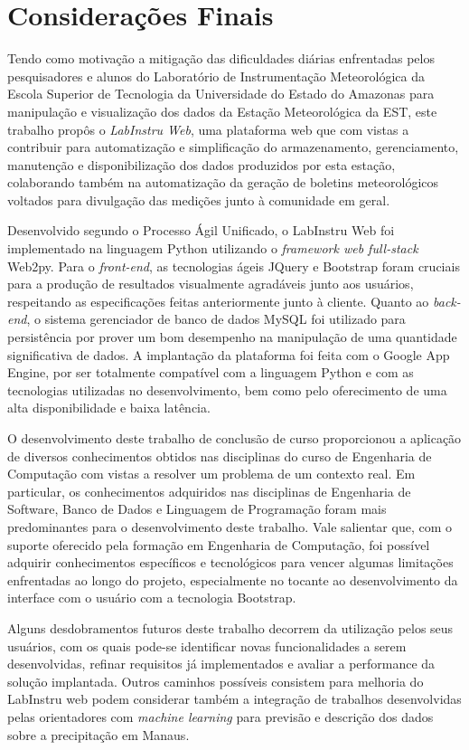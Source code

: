 \chapter{Considerações Finais} \label{cap:consideracoes}

Tendo como motivação a mitigação das dificuldades diárias enfrentadas pelos pesquisadores e alunos do Laboratório de Instrumentação Meteorológica da Escola Superior de Tecnologia da Universidade do Estado do Amazonas para manipulação e visualização dos dados da Estação Meteorológica da EST, este trabalho propôs o \emph{LabInstru Web}, uma plataforma web que com vistas a contribuir para automatização e simplificação do armazenamento, gerenciamento, manutenção e disponibilização dos dados produzidos por esta estação, colaborando também na automatização da geração de boletins meteorológicos voltados para divulgação das medições junto à comunidade em geral.

Desenvolvido segundo o Processo Ágil Unificado, o LabInstru Web foi implementado na linguagem Python utilizando o \emph{framework web full-stack} Web2py. Para o \emph{front-end}, as tecnologias ágeis JQuery e Bootstrap foram cruciais para a produção de resultados visualmente agradáveis junto aos usuários, respeitando as especificações feitas anteriormente junto à cliente. Quanto ao \emph{back-end}, o sistema gerenciador de banco de dados MySQL foi utilizado para persistência por prover um bom desempenho na manipulação de uma quantidade significativa de dados. A implantação da plataforma foi feita com o Google App Engine, por ser totalmente compatível com a linguagem Python e com as tecnologias utilizadas no desenvolvimento, bem como pelo oferecimento de uma alta disponibilidade e baixa latência.

O desenvolvimento deste trabalho de conclusão de curso proporcionou a aplicação de diversos conhecimentos obtidos nas disciplinas do curso de Engenharia de Computação com vistas a resolver um problema de um contexto real. Em particular, os conhecimentos adquiridos nas disciplinas de Engenharia de Software, Banco de Dados e Linguagem de Programação foram mais predominantes para o desenvolvimento deste trabalho. Vale salientar que, com o suporte oferecido pela formação em Engenharia de Computação, foi possível adquirir conhecimentos específicos e tecnológicos para vencer algumas limitações enfrentadas ao longo do projeto, especialmente no tocante ao desenvolvimento da interface com o usuário com a tecnologia Bootstrap.

Alguns desdobramentos futuros deste trabalho decorrem da utilização pelos seus usuários, com os quais pode-se identificar novas funcionalidades a serem desenvolvidas, refinar requisitos já implementados e avaliar a performance da solução implantada. Outros caminhos possíveis consistem para melhoria do LabInstru web podem considerar também a integração de trabalhos desenvolvidas pelas orientadores com \emph{machine learning} para previsão e descrição dos dados sobre a precipitação em Manaus.
